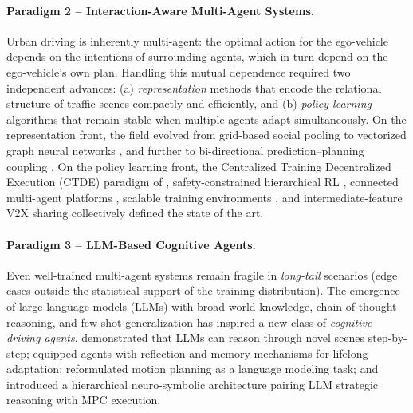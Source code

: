 \documentclass[12pt, a4paper]{article}
\begin{document}
\paragraph{Paradigm 2 -- Interaction-Aware Multi-Agent Systems.}
Urban driving is inherently multi-agent: the optimal action for the ego-vehicle
depends on the intentions of surrounding agents, which in turn depend on the
ego-vehicle's own plan. Handling this mutual dependence required two independent
advances: (a) \emph{representation} methods that encode the relational structure of
traffic scenes compactly and efficiently, and (b) \emph{policy learning} algorithms
that remain stable when multiple agents adapt simultaneously. On the representation
front, the field evolved from grid-based social pooling \citep{alahi2016social} to
vectorized graph neural networks \citep{gao2020vectornet}, and further to
bi-directional prediction--planning coupling \citep{song2020pip}. On the policy
learning front, the Centralized Training Decentralized Execution (CTDE) paradigm
of \citet{lowe2017multi}, safety-constrained hierarchical RL \citep{shalev2016safe},
connected multi-agent platforms \citep{palanisamy2020multi}, scalable training
environments \citep{zhou2020smarts}, and intermediate-feature V2X sharing
\citep{wang2020v2vnet} collectively defined the state of the art.

\paragraph{Paradigm 3 -- LLM-Based Cognitive Agents.}
Even well-trained multi-agent systems remain fragile in \emph{long-tail} scenarios
(edge cases outside the statistical support of the training distribution). The
emergence of large language models (LLMs) with broad world knowledge, chain-of-thought
reasoning, and few-shot generalization has inspired a new class of \emph{cognitive
driving agents}. \citet{fu2023drive} demonstrated that LLMs can reason through
novel scenes step-by-step; \citet{wen2023dilu} equipped agents with
reflection-and-memory mechanisms for lifelong adaptation; \citet{mao2023gpt}
reformulated motion planning as a language modeling task; and
\citet{sha2023languagempc} introduced a hierarchical neuro-symbolic architecture
pairing LLM strategic reasoning with MPC execution.
\end{document}
